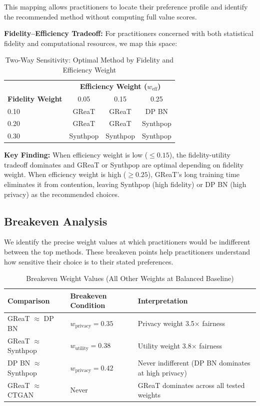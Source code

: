 \documentclass[12pt,a4paper]{article}
\begin{document}
This mapping allows practitioners to locate their preference profile and identify the recommended method without computing full value scores.

\textbf{Fidelity--Efficiency Tradeoff:} For practitioners concerned with both statistical fidelity and computational resources, we map this space:

\begin{table}[htbp]
\centering
\caption{Two-Way Sensitivity: Optimal Method by Fidelity and Efficiency Weight}
\begin{tabular}{@{}l|ccc@{}}
\toprule
& \multicolumn{3}{c}{\textbf{Efficiency Weight ($w_{\text{eff}}$)}} \\
\textbf{Fidelity Weight} & 0.05 & 0.15 & 0.25 \\
\midrule
0.10 & GReaT & GReaT & DP BN \\
0.20 & GReaT & GReaT & Synthpop \\
0.30 & Synthpop & Synthpop & Synthpop \\
\bottomrule
\end{tabular}
\end{table}

\textbf{Key Finding:} When efficiency weight is low ($\leq 0.15$), the fidelity-utility tradeoff dominates and GReaT or Synthpop are optimal depending on fidelity weight. When efficiency weight is high ($\geq 0.25$), GReaT's long training time eliminates it from contention, leaving Synthpop (high fidelity) or DP BN (high privacy) as the recommended choices.

\subsection{Breakeven Analysis}

We identify the precise weight values at which practitioners would be indifferent between the top methods. These breakeven points help practitioners understand how sensitive their choice is to their stated preferences.

\begin{table}[htbp]
\centering
\caption{Breakeven Weight Values (All Other Weights at Balanced Baseline)}
\label{tab:breakeven}
\begin{tabular}{@{}lll@{}}
\toprule
\textbf{Comparison} & \textbf{Breakeven Condition} & \textbf{Interpretation} \\
\midrule
GReaT $\approx$ DP BN & $w_{\text{privacy}} = 0.35$ & Privacy weight 3.5$\times$ fairness \\
GReaT $\approx$ Synthpop & $w_{\text{utility}} = 0.38$ & Utility weight 3.8$\times$ fairness \\
DP BN $\approx$ Synthpop & $w_{\text{privacy}} = 0.42$ & Never indifferent (DP BN dominates at high privacy) \\
GReaT $\approx$ CTGAN & Never & GReaT dominates across all tested weights \\
\bottomrule
\end{tabular}
\end{table}
\end{document}
